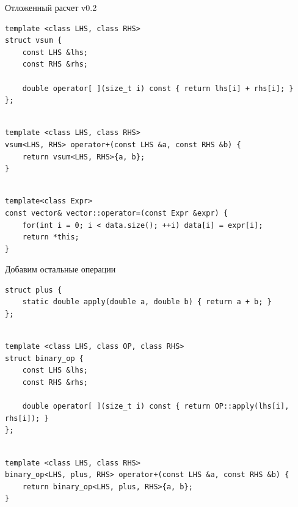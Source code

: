 \documentclass[@BEAMER_OPTIONS@]{beamer}
\begin{document}
\begin{frame}[fragile,shrink=2]{Отложенный расчет v0.2}
    \begin{exampleblock}{}
        \begin{lstlisting}
template <class LHS, class RHS>
struct vsum {
    const LHS &lhs;
    const RHS &rhs;

    double operator[ ](size_t i) const { return lhs[i] + rhs[i]; }
};
        \end{lstlisting}
        \pause
        \begin{lstlisting}[firstnumber=last]

template <class LHS, class RHS>
vsum<LHS, RHS> operator+(const LHS &a, const RHS &b) {
    return vsum<LHS, RHS>{a, b};
}
        \end{lstlisting}
        \pause
        \begin{lstlisting}[firstnumber=last]

template<class Expr>
const vector& vector::operator=(const Expr &expr) {
    for(int i = 0; i < data.size(); ++i) data[i] = expr[i];
    return *this;
}
        \end{lstlisting}
    \end{exampleblock}
\end{frame}

\begin{frame}[fragile]{Добавим остальные операции}
    \begin{exampleblock}{}
        \begin{lstlisting}
struct plus {
    static double apply(double a, double b) { return a + b; }
};
        \end{lstlisting}
        \pause
        \begin{lstlisting}[firstnumber=last]

template <class LHS, class OP, class RHS>
struct binary_op {
    const LHS &lhs;
    const RHS &rhs;

    double operator[ ](size_t i) const { return OP::apply(lhs[i], rhs[i]); }
};
        \end{lstlisting}
        \pause
        \begin{lstlisting}[firstnumber=last]

template <class LHS, class RHS>
binary_op<LHS, plus, RHS> operator+(const LHS &a, const RHS &b) {
    return binary_op<LHS, plus, RHS>{a, b};
}
        \end{lstlisting}
    \end{exampleblock}
\end{frame}
\end{document}
